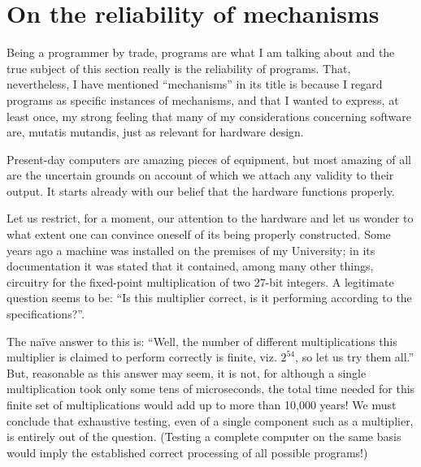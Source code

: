 \section{On the reliability of mechanisms}
\label{sec:realiability-of-mechanisms}

Being a programmer by trade, programs are what I am talking about and the true subject of this section really is the reliability of programs. That, nevertheless, I have mentioned ``mechanisms'' in its title is because I regard programs as specific instances of mechanisms, and that I wanted to express, at least once, my strong feeling that many of my considerations concerning software are, mutatis mutandis, just as relevant for hardware design.

Present-day computers are amazing pieces of equipment, but most amazing of all are the uncertain grounds on account of which we attach any validity to their output. It starts already with our belief that the hardware functions properly.

Let us restrict, for a moment, our attention to the hardware and let us wonder to what extent one can convince oneself of its being properly constructed. Some years ago a machine was installed on the premises of my University; in its documentation it was stated that it contained, among many other things, circuitry for the fixed-point multiplication of two 27-bit integers. A legitimate question seems to be: ``Is this multiplier correct, is it performing according to the specifications?''.

The naïve answer to this is: ``Well, the number of different multiplications this multiplier is claimed to perform correctly is finite, viz. $2^{54}$, so let us try them all.'' But, reasonable as this answer may seem, it is not, for although a single multiplication took only some tens of microseconds, the total time needed for this finite set of multiplications would add up to more than 10,000 years! We must conclude that exhaustive testing, even of a single component such as a multiplier, is entirely out of the question. (Testing a complete computer on the same basis would imply the established correct processing of all possible programs!)

